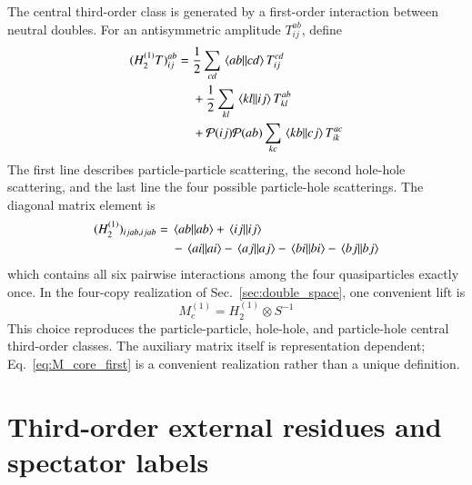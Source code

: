 \documentclass[aip,jcp,reprint,noshowkeys,superscriptaddress]{revtex4-1}
\begin{document}
The central third-order class is generated by a first-order interaction between neutral doubles.
For an antisymmetric amplitude $T_{ij}^{ab}$, define
\begin{equation}
	\begin{split}
	(H_2^{(1)}T)_{ij}^{ab}
	={}&
	\frac{1}{2}
	\sum_{cd}
	\mel{ab}{}{cd}
	T_{ij}^{cd}
	\\
	&+
	\frac{1}{2}
	\sum_{kl}
	\mel{kl}{}{ij}
	T_{kl}^{ab}
	\\
	&+
	\mathcal P(ij)\mathcal P(ab)
	\sum_{kc}
	\mel{kb}{}{cj}
	T_{ik}^{ac}
	\end{split}
	\label{eq:H2_action}
\end{equation}
The first line describes particle-particle scattering, the second hole-hole scattering, and the last line the four possible particle-hole scatterings.
The diagonal matrix element is
\begin{equation}
	\begin{split}
	(H_2^{(1)})_{ijab,ijab}
	={}&
	\mel{ab}{}{ab}
	+
	\mel{ij}{}{ij}
	\\
	&-
	\mel{ai}{}{ai}
	-
	\mel{aj}{}{aj}
	-
	\mel{bi}{}{bi}
	-
	\mel{bj}{}{bj}
	\end{split}
	\label{eq:H2_diagonal}
\end{equation}
which contains all six pairwise interactions among the four quasiparticles exactly once.
In the four-copy realization of Sec.~\ref{sec:double_space}, one convenient lift is
\begin{equation}
	M_c^{(1)}
	=
	H_2^{(1)}\otimes S^{-1}
	\label{eq:M_core_first}
\end{equation}
This choice reproduces the particle-particle, hole-hole, and particle-hole central third-order classes.
The auxiliary matrix itself is representation dependent; Eq.~\eqref{eq:M_core_first} is a convenient realization rather than a unique definition.

\section[External residues and spectators]{Third-order external residues and spectator labels}
\label{sec:spectator_space}
\end{document}

